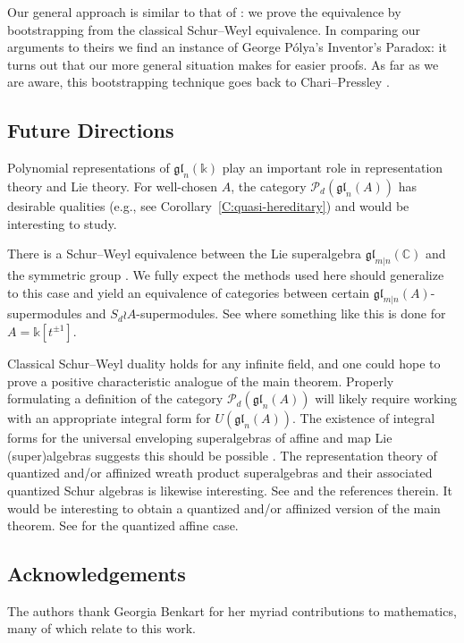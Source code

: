 \documentclass[11pt,reqno]{amsart} %
\newcommand{\C}{\mathbb{C}}
\newcommand{\gl}{\mathfrak{gl}}
\renewcommand{\k}{\mathds{k}}
\newcommand{\0}{\bar{0}}
\newcommand{\1}{\bar{1}}
\newcommand{\wreath}{\wr}
\newcommand{\SdwreathA}{S_{d} \wreath A}
\newcommand{\Pol}{\mathcal{P}}
\numberwithin{equation}{subsection}
\begin{document}
Our general approach is similar to that of \cite{Flicker,CGLMUW}: we prove the equivalence by bootstrapping from the classical Schur--Weyl equivalence.    In comparing our arguments to theirs we find an instance of George P\'{o}lya's Inventor's Paradox: it turns out that our more general situation makes for easier proofs. As far as we are aware, this bootstrapping technique goes back to Chari--Pressley \cite{ChariPressley}.

\subsection{Future Directions}\label{SS:FutureDirections}  Polynomial representations of $\gl_{n}(\k )$ play an important role in representation theory and Lie theory.  For well-chosen $A$, the category $\Pol_{d}(\gl_{n}(A))$ has desirable qualities (e.g., see Corollary~\ref{C:quasi-hereditary}) and would be interesting to study.


There is a Schur--Weyl equivalence between the Lie superalgebra $\gl_{m|n}(\C)$ and the symmetric group \cite{BereleRegev,Sergeev}.  We fully expect the methods used here should generalize to this case and yield an equivalence of categories between certain $\gl_{m|n}(A)$-supermodules and $\SdwreathA$-supermodules.  See \cite{Flicker2} where something like this is done for $A=\k[t^{\pm 1}]$.

Classical Schur--Weyl duality holds for any infinite field, and one could hope to prove a positive characteristic analogue of the main theorem.  Properly formulating a definition of the category $\Pol_{d}(\gl_{n}(A))$ will likely require working with an appropriate integral form for $U(\gl_{n}(A))$.  The existence of integral forms for the universal enveloping superalgebras of affine and map Lie (super)algebras suggests this should be possible \cite{BagciChamberlin,Chamberlin,Garland}.  The representation theory of quantized and/or affinized wreath product superalgebras and their associated quantized Schur algebras is likewise interesting.  See \cite{LNX,RossoSavage-Wreath,Savage,WanWang} and the references therein.  It would be interesting to obtain a quantized and/or affinized version of the main theorem.  See \cite{ChariPressley} for the quantized affine case.

\subsection{Acknowledgements}\label{SS:Acknowledgements} The authors thank Georgia Benkart for her myriad contributions to mathematics, many of which relate to this work.
\end{document}
